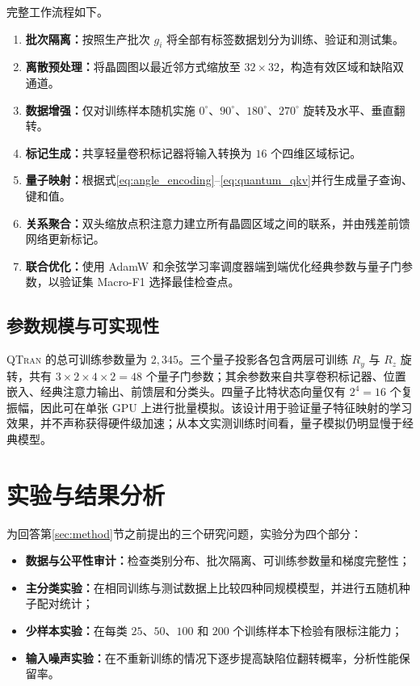 \documentclass[journal]{IEEEtran}
\newcommand{\qtran}{\textsc{QTran}}
\begin{document}
完整工作流程如下。

\begin{enumerate}[leftmargin=1.8em]
  \item \textbf{批次隔离：}按照生产批次 $g_i$ 将全部有标签数据划分为训练、验证和测试集。
  \item \textbf{离散预处理：}将晶圆图以最近邻方式缩放至 $32\times32$，构造有效区域和缺陷双通道。
  \item \textbf{数据增强：}仅对训练样本随机实施 $0^\circ$、$90^\circ$、$180^\circ$、$270^\circ$ 旋转及水平、垂直翻转。
  \item \textbf{标记生成：}共享轻量卷积标记器将输入转换为 $16$ 个四维区域标记。
  \item \textbf{量子映射：}根据式\eqref{eq:angle_encoding}--\eqref{eq:quantum_qkv}并行生成量子查询、键和值。
  \item \textbf{关系聚合：}双头缩放点积注意力建立所有晶圆区域之间的联系，并由残差前馈网络更新标记。
  \item \textbf{联合优化：}使用 AdamW 和余弦学习率调度器端到端优化经典参数与量子门参数，以验证集 Macro-F1 选择最佳检查点。
\end{enumerate}

\subsection{参数规模与可实现性}

\qtran{} 的总可训练参数量为 $2{,}345$。三个量子投影各包含两层可训练 $R_y$ 与 $R_z$ 旋转，共有 $3\times2\times4\times2=48$ 个量子门参数；其余参数来自共享卷积标记器、位置嵌入、经典注意力输出、前馈层和分类头。四量子比特状态向量仅有 $2^4=16$ 个复振幅，因此可在单张 GPU 上进行批量模拟。该设计用于验证量子特征映射的学习效果，并不声称获得硬件级加速；从本文实测训练时间看，量子模拟仍明显慢于经典模型。

\section{实验与结果分析}
\label{sec:experiment}

为回答第\ref{sec:method}节之前提出的三个研究问题，实验分为四个部分：

\begin{itemize}[leftmargin=1.5em]
  \item \textbf{数据与公平性审计：}检查类别分布、批次隔离、可训练参数量和梯度完整性；
  \item \textbf{主分类实验：}在相同训练与测试数据上比较四种同规模模型，并进行五随机种子配对统计；
  \item \textbf{少样本实验：}在每类 $25$、$50$、$100$ 和 $200$ 个训练样本下检验有限标注能力；
  \item \textbf{输入噪声实验：}在不重新训练的情况下逐步提高缺陷位翻转概率，分析性能保留率。
\end{itemize}
\end{document}
